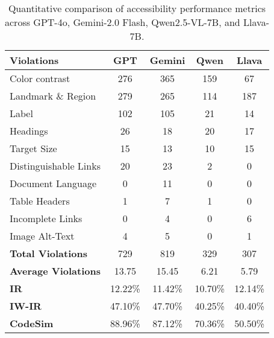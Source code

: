 \renewcommand{\arraystretch}{1.1}
\begin{table}
\tabcolsep=0.5cm
\centering
\small

\begin{tabular}{l|c|c|c|c} 
\hline
\rowcolor{lightgray} \textbf{Violations} & \textbf{GPT} & \textbf{Gemini} & \textbf{Qwen} & \textbf{Llava}  \\ 
\hline
Color contrast & 276 & 365 & 159 & 67 \\
\hline
Landmark \& Region & 279 & 265 & 114 & 187 \\
\hline
Label & 102 & 105 & 21 & 14 \\
\hline
Headings & 26 & 18 & 20 & 17 \\
\hline
Target Size & 15 & 13 & 10 & 15 \\
\hline
Distinguishable Links & 20 & 23 & 2 & 0 \\
\hline
Document Language & 0 & 11 & 0 & 0 \\
\hline
Table Headers & 1 & 7 & 1 & 0 \\
\hline
Incomplete Links & 0 & 4 & 0 & 6 \\
\hline
Image Alt-Text & 4 & 5 & 0 & 1 \\
\hline
\hline
\textbf{Total Violations} & 729 & 819 & 329 & 307 \\
\hline
\textbf{Average Violations} & 13.75 & 15.45 & 6.21 & 5.79 \\
\hline
\textbf{IR} & 12.22\% & 11.42\% & 10.70\% & 12.14\% \\
\hline
\textbf{IW-IR} & 47.10\% & 47.70\% & 40.25\% & 40.40\% \\
\hline
\textbf{CodeSim} & 88.96\% & 87.12\% & 70.36\% & 50.50\% \\
\hline
\end{tabular}
\caption{Quantitative comparison of accessibility performance metrics across GPT-4o, Gemini-2.0 Flash, Qwen2.5-VL-7B, and Llava-7B.}
\label{tab:table-performance}
\end{table}